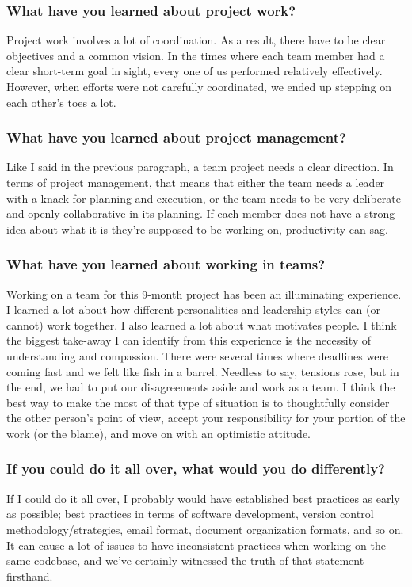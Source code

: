 \subsubsection{What have you learned about project work?}
Project work involves a lot of coordination. As a result, there have to be clear objectives and a common vision. In the times where each team member had a clear short-term goal in sight, every one of us performed relatively effectively. However, when efforts were not carefully coordinated, we ended up stepping on each other's toes a lot.

\subsubsection{What have you learned about project management?}
Like I said in the previous paragraph, a team project needs a clear direction. In terms of project management, that means that either the team needs a leader with a knack for planning and execution, or the team needs to be very deliberate and openly collaborative in its planning. If each member does not have a strong idea about what it is they're supposed to be working on, productivity can sag.

\subsubsection{What have you learned about working in teams?}
Working on a team for this 9-month project has been an illuminating experience. I learned a lot about how different personalities and leadership styles can (or cannot) work together. I also learned a lot about what motivates people. I think the biggest take-away I can identify from this experience is the necessity of understanding and compassion. There were several times where deadlines were coming fast and we felt like fish in a barrel. Needless to say, tensions rose, but in the end, we had to put our disagreements aside and work as a team. I think the best way to make the most of that type of situation is to thoughtfully consider the other person's point of view, accept your responsibility for your portion of the work (or the blame), and move on with an optimistic attitude.

\subsubsection{If you could do it all over, what would you do differently?}
If I could do it all over, I probably would have established best practices as early as possible; best practices in terms of software development, version control methodology/strategies, email format, document organization formats, and so on. It can cause a lot of issues to have inconsistent practices when working on the same codebase, and we've certainly witnessed the truth of that statement firsthand.